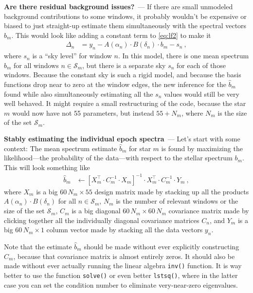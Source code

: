 \documentclass[11pt]{article}
\renewcommand{\paragraph}[1]{\medskip\par\noindent\textbf{#1}~---}
\begin{document}
\paragraph{Are there residual background issues?}
If there are small unmodeled background contributions to some windows, it probably wouldn't be expensive or biased to just straight-up estimate them simultaneously with the spectral vectors $\hat{b}_m$.
This would look like adding a constant term to \eqref{eq:lf2} to make it
\begin{align}
    \Delta_n &= y_n - A(\alpha_n)\cdot B(\delta_n)\cdot b_m - s_n~,
\end{align}
where $s_n$ is a ``sky level'' for window $n$.
In this model, there is one mean spectrum $b_m$ for all windows $n\in\mathscr{S}_m$, but there is a separate sky $s_n$ for each of those windows.
Because the constant sky is such a rigid model, and because the basis functions drop near to zero at the window edges, the new inference for the $\hat{b}_m$ found while also simultaneously estimating all the $s_n$ values would still be very well behaved.
It might require a small restructuring of the code, because the star $m$ would now have not 55 parameters, but instead $55+N_m$, where $N_m$ is the size of the set $\mathscr{S}_m$.

\paragraph{Stably estimating the individual epoch spectra}
Let's start with some context: The mean spectrum estimate $\hat{b}_m$ for star $m$ is found by maximizing the likelihood---the probability of the data---with respect to the stellar spectrum $b_m$.
This will look something like
\begin{align}
  \hat{b}_m &\leftarrow [X_m^\top\cdot C_m^{-1}\cdot X_m]^{-1}\cdot X_m^\top\cdot C_m^{-1}\cdot Y_m ~,
\end{align}
where $X_m$ is a big $60\,N_m\times 55$ design matrix made by stacking up all the products $A(\alpha_n)\cdot B(\delta_n)$ for all $n\in\mathscr{S}_m$,
$N_m$ is the number of relevant windows or the size of the set $\mathscr{S}_m$,
$C_m$ is a big diagonal $60\,N_m\times 60\,N_m$ covariance matrix made by clicking together all the individually diagonal covariance matrices $C_n$,
and $Y_m$ is a big $60\,N_m\times 1$ column vector made by stacking all the data vectors $y_n$.

Note that the estimate $\hat{b}_m$ should be made without ever explicitly constructing $C_m$, because that covariance matrix is almost entirely zeros.
It should also be made without ever actually running the linear algebra \texttt{inv()} function.
It is way better to use the function \texttt{solve()} or even better \texttt{lstsq()}, where in the latter case you can set the condition number to eliminate very-near-zero eigenvalues.
\end{document}
